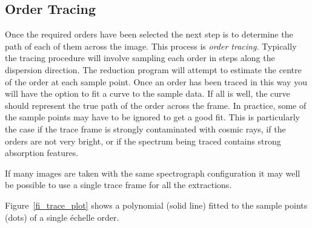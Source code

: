 \documentclass[twoside,11pt]{article}
\newcommand{\xlabel}[1]{}
\newcommand{\sgspec}[2]{#1}
\newcommand{\sgspec}[2]{#2}
\begin{document}
\subsection{\label{se_order_tracing}\xlabel{order_tracing}Order Tracing}

Once the required orders have been selected the next step is to
determine the path of each of them across the image.  This process is {\sl
order tracing.}  Typically the tracing procedure will involve sampling
each order in steps along the dispersion direction.  The reduction
program will attempt to estimate the centre of the order at each sample
point.  Once an order has been traced in this way you will have the
option to fit a curve to the sample data.  If all is well, the curve
should represent the true path of the order across the frame.  In
practice, some of the sample points may have to be ignored to get a good
fit.  This is particularly the case if the trace frame is strongly
contaminated with cosmic rays, if the orders are not very bright, or if
the spectrum being traced contains strong absorption features.

If many images are taken with the same spectrograph configuration it may
well be possible to use a single trace frame for all the extractions.

\sgspec{Figure~\ref{fi_trace_plot}}{The figure below} shows a polynomial
(solid line) fitted to the sample points (dots) of a single
\'{e}chelle order.
\end{document}
